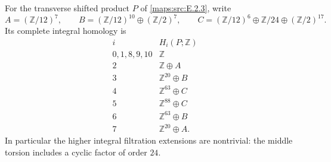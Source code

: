 \begin{theorem}\label{maps:src:E.2.6}


For the transverse shifted product $P$ of \ref{maps:src:E.2.3}, write
\[
 A=(\mathbb Z/12)^7,\qquad
 B=(\mathbb Z/12)^{10}\oplus(\mathbb Z/2)^7,\qquad
 C=(\mathbb Z/12)^6\oplus\mathbb Z/24\oplus(\mathbb Z/2)^{17}.
\]
Its complete integral homology is
\[
 \begin{array}{c|l}
 i&H_i(P;\mathbb Z)\\\hline
 0,1,8,9,10&\mathbb Z\\
 2&\mathbb Z\oplus A\\
 3&\mathbb Z^{20}\oplus B\\
 4&\mathbb Z^{63}\oplus C\\
 5&\mathbb Z^{88}\oplus C\\
 6&\mathbb Z^{63}\oplus B\\
 7&\mathbb Z^{20}\oplus A.
 \end{array}
\]
In particular the higher integral filtration extensions are nontrivial:
the middle torsion includes a cyclic factor of order $24$.
\end{theorem}


